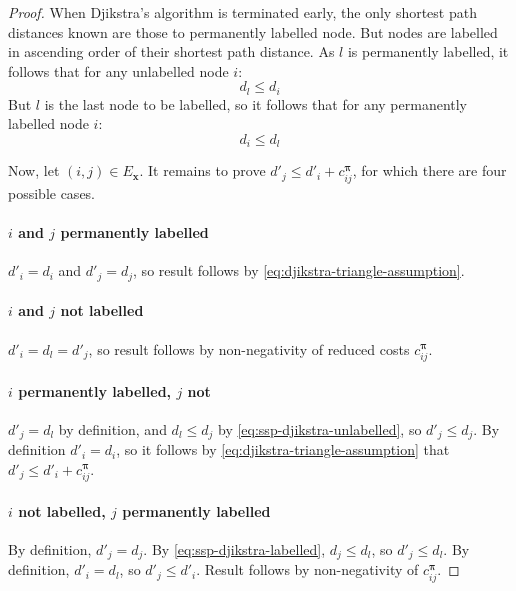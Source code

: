 \begin{proof}
    When Djikstra's algorithm is terminated early, the only shortest path distances known are those to permanently labelled node. But nodes are labelled in ascending order of their shortest path distance. As $l$ is permanently labelled, it follows that for any unlabelled node $i$:
    \begin{equation} \label{eq:ssp-djikstra-unlabelled}
    d_l \leq d_i
    \end{equation}
    But $l$ is the last node to be labelled, so it follows that for any permanently labelled node $i$:
    \begin{equation} \label{eq:ssp-djikstra-labelled}
    d_i \leq d_l
    \end{equation}
    
    Now, let $(i,j) \in E_{\mathbf{x}}$. It remains to prove $d'_j \leq d'_i + c^{\boldsymbol{\pi}}_{ij}$, for which there are four possible cases.
    
    \paragraph{$i$ and $j$ permanently labelled} $d'_i = d_i$ and $d'_j = d_j$, so result follows by \cref{eq:djikstra-triangle-assumption}.
    
    \paragraph{$i$ and $j$ not labelled} $d'_i = d_l = d'_j$, so result follows by non-negativity of reduced costs $c^{\boldsymbol{\pi}}_{ij}$.
    
    \paragraph{$i$ permanently labelled, $j$ not} $d'_j = d_l$ by definition, and $d_l \leq d_j$ by \cref{eq:ssp-djikstra-unlabelled}, so $d'_j \leq d_j$. By definition $d'_i = d_i$, so it follows by \cref{eq:djikstra-triangle-assumption} that $d'_j \leq d'_i + c^{\boldsymbol{\pi}}_{ij}$.
    
    \paragraph{$i$ not labelled, $j$ permanently labelled} By definition, $d'_j = d_j$. By \cref{eq:ssp-djikstra-labelled}, $d_j \leq d_l$, so $d'_j \leq d_l$. By definition, $d'_i = d_l$, so $d'_j \leq d'_i$. Result follows by non-negativity of $c^{\boldsymbol{\pi}}_{ij}$.
\end{proof}

